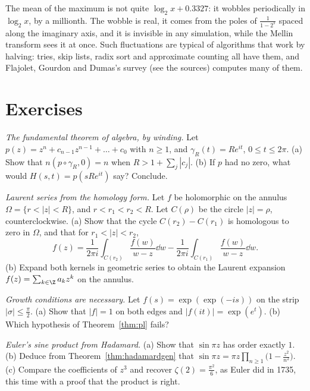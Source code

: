 \begin{beauty}
The mean of the maximum is not quite $\log_2x+0.3327$: it wobbles periodically in $\log_2x$, by a millionth. The wobble is real, it comes from the poles of $\frac1{1-2^s}$ spaced along the imaginary
axis, and it is invisible in any simulation, while the Mellin transform sees it at once. Such fluctuations are typical of algorithms that work by halving: tries, skip lists, radix sort
and approximate counting all have them, and Flajolet, Gourdon and Dumas's survey (see the sources) computes many of them.
\end{beauty}

\section{Exercises}

\begin{exercise}[$\star$]\label{ex:ftawind}
\emph{The fundamental theorem of algebra, by winding.} Let $p(z)=z^n+c_{n-1}z^{n-1}+\dots+c_0$ with $n\ge1$, and $\gamma_R(t)=Re^{it}$, $0\le t\le2\pi$. (a) Show that $n(p\circ\gamma_R,0)=n$ when $R>1+\sum_j|c_j|$.
(b) If $p$ had no zero, what would $H(s,t)=p(sRe^{it})$ say? Conclude.
\end{exercise}

\begin{exercise}[$\star\star$]\label{ex:annuluscauchy}
\emph{Laurent series from the homology form.} Let $f$ be holomorphic on the annulus $\Omega=\{r<|z|<R\}$, and $r<r_1<r_2<R$. Let $C(\rho)$ be the circle $|z|=\rho$, counterclockwise. (a) Show that the cycle
$C(r_2)-C(r_1)$ is homologous to zero in $\Omega$, and that for $r_1<|z|<r_2$,
\[
f(z)=\frac1{2\pi i}\int_{C(r_2)}\frac{f(w)}{w-z}\dd w-\frac1{2\pi i}\int_{C(r_1)}\frac{f(w)}{w-z}\dd w.
\]
(b) Expand both kernels in geometric series to obtain the Laurent expansion $f(z)=\sum_{k\in\Z}a_kz^k$ on the annulus.
\end{exercise}

\begin{exercise}[$\star$]\label{ex:plsharp}
\emph{Growth conditions are necessary.} Let $f(s)=\exp(\exp(-is))$ on the strip $|\sigma|\le\frac\pi2$. (a) Show that $|f|=1$ on both edges and $|f(it)|=\exp(e^t)$. (b) Which hypothesis of
Theorem~\ref{thm:pl} fails?
\end{exercise}

\begin{exercise}[$\star\star$]\label{ex:sinprod}
\emph{Euler's sine product from Hadamard.} (a) Show that $\sin\pi z$ has order exactly $1$. (b) Deduce from Theorem~\ref{thm:hadamardgen} that $\sin\pi z=\pi z\prod_{n\ge1}\bigl(1-\frac{z^2}{n^2}\bigr)$. (c) Compare the
coefficients of $z^3$ and recover $\zeta(2)=\frac{\pi^2}6$, as Euler did in 1735, this time with a proof that the product is right.
\end{exercise}

